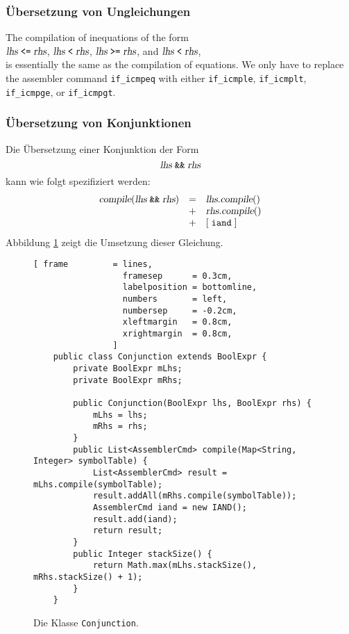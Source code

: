 \subsubsection{\"Ubersetzung von Ungleichungen}
The compilation of inequations of the form 
\\[0.2cm]
\hspace*{1.3cm}
$\textsl{lhs} \;\texttt{<=}\; \textsl{rhs}$, \quad 
$\textsl{lhs} \;\texttt{<}\; \textsl{rhs}$, \quad 
$\textsl{lhs} \;\texttt{>=}\; \textsl{rhs}$, \quad and \quad
$\textsl{lhs} \;\texttt{<}\; \textsl{rhs}$,
\\[0.2cm]
is essentially the same as the compilation of equations.  We only have to replace the assembler
command \texttt{if\_icmpeq} with either \texttt{if\_icmple}, \texttt{if\_icmplt},
\texttt{if\_icmpge}, or \texttt{if\_icmpgt}.

\subsubsection{\"Ubersetzung von Konjunktionen}
Die \"Ubersetzung einer Konjunktion der Form
\[ \textsl{lhs}\;\texttt{\&\&}\;\textsl{rhs} \]
kann wie folgt spezifiziert werden:
\[
   \begin{array}[t]{lcl}
   \textsl{compile}(\textsl{lhs}\;\texttt{\&\&}\;\textsl{rhs}) & = & 
         \textsl{lhs}.\textsl{compile}()  \\
   & + & \textsl{rhs}.\textsl{compile}()  \\
   & + & [ \;\texttt{iand}\; ]  
\end{array}
\]
Abbildung \ref{fig:Expr:Conjunction.java} zeigt die Umsetzung dieser Gleichung.

\begin{figure}[!ht]
\centering
\begin{Verbatim}[ frame         = lines, 
                  framesep      = 0.3cm, 
                  labelposition = bottomline,
                  numbers       = left,
                  numbersep     = -0.2cm,
                  xleftmargin   = 0.8cm,
                  xrightmargin  = 0.8cm,
                ]
    public class Conjunction extends BoolExpr {
        private BoolExpr mLhs;
        private BoolExpr mRhs;
    
        public Conjunction(BoolExpr lhs, BoolExpr rhs) {
            mLhs = lhs;
            mRhs = rhs;
        }
        public List<AssemblerCmd> compile(Map<String, Integer> symbolTable) {
            List<AssemblerCmd> result = mLhs.compile(symbolTable);
            result.addAll(mRhs.compile(symbolTable));
            AssemblerCmd iand = new IAND();
            result.add(iand);
            return result;
        }
        public Integer stackSize() {
            return Math.max(mLhs.stackSize(), mRhs.stackSize() + 1);
        }
    }
\end{Verbatim}
\vspace*{-0.3cm}
\caption{Die Klasse \texttt{Conjunction}.}
\label{fig:Expr:Conjunction.java}
\end{figure}

